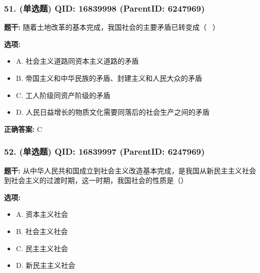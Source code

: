 \documentclass[12pt,UTF8]{ctexart}
\begin{document}
\vspace{0.3em}\hrulefill\vspace{0.7em}

\subsubsection*{51. (单选题) \small QID: 16839998 (ParentID: 6247969)}

\textbf{题干:}
随着土地改革的基本完成，我国社会的主要矛盾已转变成（  ）



\textbf{选项:}
\begin{itemize}[leftmargin=*]

  \item A. 社会主义道路同资本主义道路的矛盾

  \item B. 帝国主义和中华民族的矛盾、封建主义和人民大众的矛盾

  \item C. 工人阶级同资产阶级的矛盾

  \item D. 人民日益增长的物质文化需要同落后的社会生产之间的矛盾

\end{itemize}

\textbf{正确答案:}
C

\vspace{0.3em}\hrulefill\vspace{0.7em}

\subsubsection*{52. (单选题) \small QID: 16839997 (ParentID: 6247969)}

\textbf{题干:}
从中华人民共和国成立到社会主义改造基本完成，是我国从新民主主义社会到社会主义的过渡时期，这一时期，我国社会的性质是（）



\textbf{选项:}
\begin{itemize}[leftmargin=*]

  \item A. 资本主义社会

  \item B. 社会主义社会

  \item C. 民主主义社会

  \item D. 新民主主义社会

\end{itemize}
\end{document}

